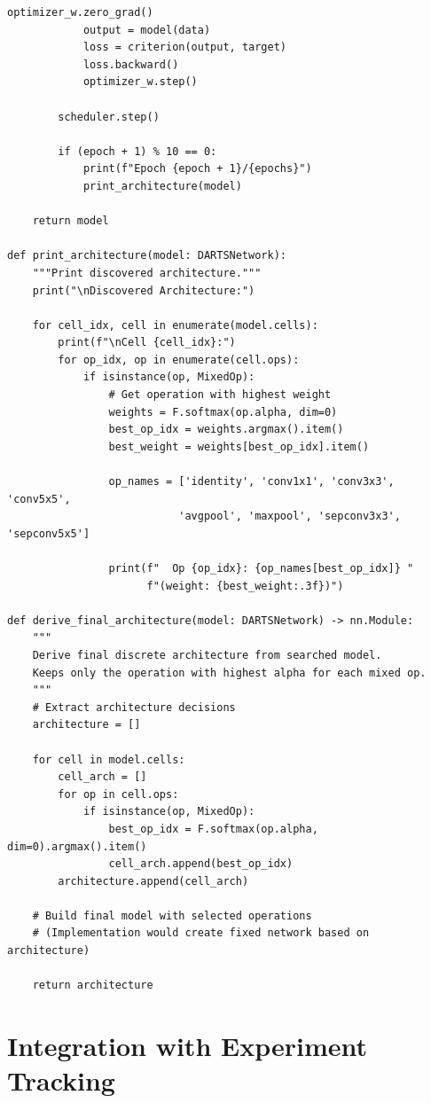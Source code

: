 \begin{lstlisting}[style=python, caption=Neural Architecture Search with DARTS]
            optimizer_w.zero_grad()
            output = model(data)
            loss = criterion(output, target)
            loss.backward()
            optimizer_w.step()

        scheduler.step()

        if (epoch + 1) % 10 == 0:
            print(f"Epoch {epoch + 1}/{epochs}")
            print_architecture(model)

    return model

def print_architecture(model: DARTSNetwork):
    """Print discovered architecture."""
    print("\nDiscovered Architecture:")

    for cell_idx, cell in enumerate(model.cells):
        print(f"\nCell {cell_idx}:")
        for op_idx, op in enumerate(cell.ops):
            if isinstance(op, MixedOp):
                # Get operation with highest weight
                weights = F.softmax(op.alpha, dim=0)
                best_op_idx = weights.argmax().item()
                best_weight = weights[best_op_idx].item()

                op_names = ['identity', 'conv1x1', 'conv3x3', 'conv5x5',
                           'avgpool', 'maxpool', 'sepconv3x3', 'sepconv5x5']

                print(f"  Op {op_idx}: {op_names[best_op_idx]} "
                      f"(weight: {best_weight:.3f})")

def derive_final_architecture(model: DARTSNetwork) -> nn.Module:
    """
    Derive final discrete architecture from searched model.
    Keeps only the operation with highest alpha for each mixed op.
    """
    # Extract architecture decisions
    architecture = []

    for cell in model.cells:
        cell_arch = []
        for op in cell.ops:
            if isinstance(op, MixedOp):
                best_op_idx = F.softmax(op.alpha, dim=0).argmax().item()
                cell_arch.append(best_op_idx)
        architecture.append(cell_arch)

    # Build final model with selected operations
    # (Implementation would create fixed network based on architecture)

    return architecture
\end{lstlisting}

\section{Integration with Experiment Tracking}

